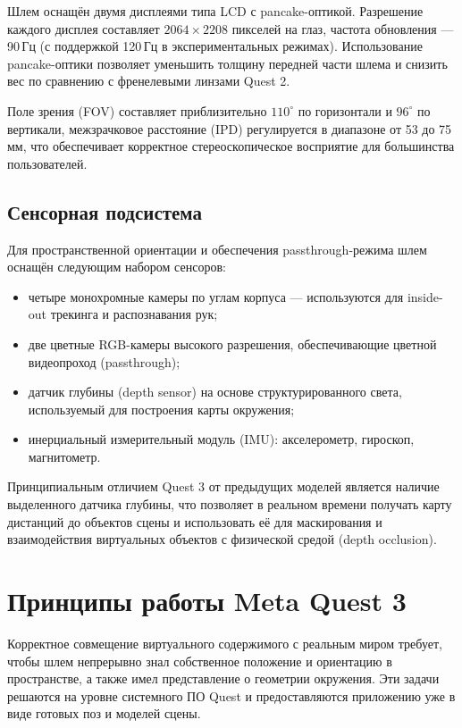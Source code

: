 \documentclass[a4paper,12pt]{article}
\begin{document}
Шлем оснащён двумя дисплеями типа LCD с pancake-оптикой. Разрешение каждого дисплея составляет $2064 \times 2208$ пикселей на глаз, частота обновления --- 90\,Гц (с поддержкой 120\,Гц в экспериментальных режимах). Использование pancake-оптики позволяет уменьшить толщину передней части шлема и снизить вес по сравнению с френелевыми линзами Quest 2.

Поле зрения (FOV) составляет приблизительно $110^\circ$ по горизонтали и $96^\circ$ по вертикали, межзрачковое расстояние (IPD) регулируется в диапазоне от 53 до 75\,мм, что обеспечивает корректное стереоскопическое восприятие для большинства пользователей.

\subsection*{Сенсорная подсистема}

Для пространственной ориентации и обеспечения passthrough-режима шлем оснащён следующим набором сенсоров:

\begin{itemize}
    \item четыре монохромные камеры по углам корпуса --- используются для inside-out трекинга и распознавания рук;
    \item две цветные RGB-камеры высокого разрешения, обеспечивающие цветной видеопроход (passthrough);
    \item датчик глубины (depth sensor) на основе структурированного света, используемый для построения карты окружения;
    \item инерциальный измерительный модуль (IMU): акселерометр, гироскоп, магнитометр.
\end{itemize}

Принципиальным отличием Quest 3 от предыдущих моделей является наличие выделенного датчика глубины, что позволяет в реальном времени получать карту дистанций до объектов сцены и использовать её для маскирования и взаимодействия виртуальных объектов с физической средой (depth occlusion).

\section*{Принципы работы Meta Quest 3}

Корректное совмещение виртуального содержимого с реальным миром требует, чтобы шлем непрерывно знал собственное положение и ориентацию в пространстве, а также имел представление о геометрии окружения. Эти задачи решаются на уровне системного ПО Quest и предоставляются приложению уже в виде готовых поз и моделей сцены.
\end{document}
